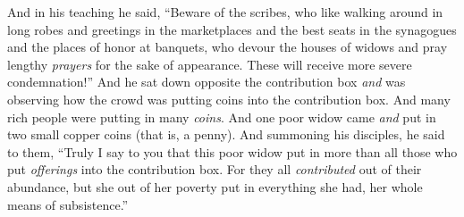 \begin{biblechapter}
 And in his teaching he said, “Beware of the scribes, who like walking around in long robes and greetings in the marketplaces
\verse and the best seats in the synagogues and the places of honor at banquets,
\verse who devour the houses of widows and pray lengthy \textit{prayers} for the sake of appearance. These will receive more severe condemnation!”
 And he sat down opposite the contribution box \textit{and} was observing how the crowd was putting coins into the contribution box. And many rich people were putting in many \textit{coins}.
\verse And one poor widow came \textit{and} put in two small copper coins (that is, a penny).
\verse And summoning his disciples, he said to them, “Truly I say to you that this poor widow put in more than all those who put \textit{offerings} into the contribution box.
\verse For they all \textit{contributed} out of their abundance, but she out of her poverty put in everything she had, her whole means of subsistence.”
\end{biblechapter}

